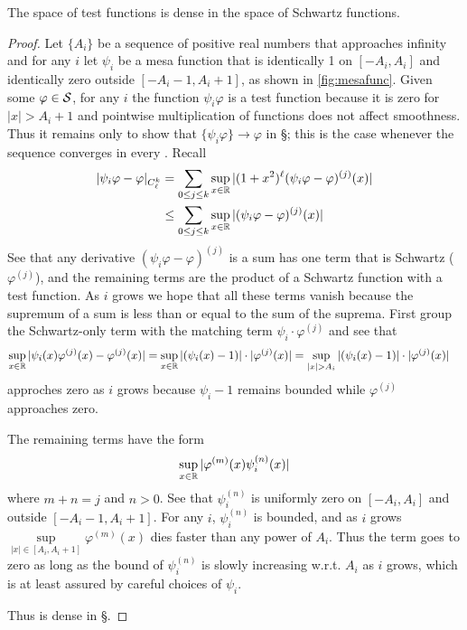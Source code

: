     \begin{lemma}
      \label{lemma:ddenseins}
      The space of test functions is dense in the space of Schwartz functions.
    \end{lemma}
    \begin{proof}
      Let $\{A_i\}$ be a sequence of positive real numbers that approaches infinity and for any $i$ let $\psi_i$ be a mesa function that is identically 1 on $[-A_i,A_i]$ and identically zero outside $[-A_i-1,A_i+1]$, as shown in \cref{fig:mesafunc}.
      Given some $\varphi\in\S$, for any $i$ the function $\psi_i\varphi$ is a test function because it is zero for $|x|>A_i+1$ and pointwise multiplication of functions does not affect smoothness.
      Thus it remains only to show that $\{\psi_i\varphi\}\rightarrow\varphi$ in \S; this is the case whenever the sequence converges in every \Ckl.
      Recall
      \begin{align*}
        |\psi_i\varphi - \varphi|_\Ckl
        &= \sum_{0\le j\le k} \sup_{x\in\R} |(1+x^2)^\ell (\psi_i\varphi-\varphi)^{(j)}(x)|
        \\&\le \sum_{0\le j\le k} \sup_{x\in\R} |(\psi_i\varphi-\varphi)^{(j)}(x)|
      \end{align*}
      See that any derivative $(\psi_i\varphi-\varphi)^{(j)}$ is a sum has one term that is Schwartz ($\varphi^{(j)}$), and the remaining terms are the product of a Schwartz function with a test function.
      As $i$ grows we hope that all these terms vanish because the supremum of a sum is less than or equal to the sum of the suprema.
      First group the Schwartz-only term with the matching term $\psi_i\cdot\varphi^{(j)}$ and see that 
      \begin{align*}
        \sup_{x\in\R} |\psi_i(x)\varphi^{(j)}(x)-\varphi^{(j)}(x)|
        &= \sup_{x\in\R} |(\psi_i(x)-1)|\cdot|\varphi^{(j)}(x)|
        = \sup_{|x|>A_i} |(\psi_i(x)-1)|\cdot|\varphi^{(j)}(x)|
      \end{align*}
      approches zero as $i$ grows because $\psi_i-1$ remains bounded while $\varphi^{(j)}$ approaches zero.
      
      The remaining terms have the form
      \begin{align*}
        \sup_{x\in\R} |\varphi^{(m)}(x)\psi_i^{(n)}(x)|
      \end{align*}
      where $m+n=j$ and $n>0$.
      See that $\psi_i^{(n)}$ is uniformly zero on $[-A_i,A_i]$ and outside $[-A_i-1,A_i+1]$.
      For any $i$, $\psi_i^{(n)}$ is bounded, and as $i$ grows $\sup\limits_{|x|\in[A_i,A_i+1]}\varphi^{(m)}(x)$ dies faster than any power of $A_i$.
      Thus the term goes to zero as long as the bound of $\psi_i^{(n)}$ is slowly increasing w.r.t. $A_i$ as $i$ grows, which is at least assured by careful choices of $\psi_i$.  

      Thus \D is dense in \S.
    \end{proof}
